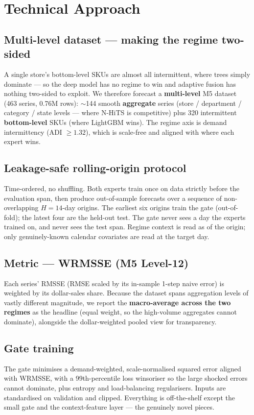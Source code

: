 \documentclass[11pt,a4paper]{article}
\begin{document}
\section{Technical Approach}
\subsection{Multi-level dataset --- making the regime two-sided}
A single store's bottom-level SKUs are almost all intermittent, where trees simply dominate --- so the
deep model has no regime to win and adaptive fusion has nothing two-sided to exploit. We therefore
forecast a \textbf{multi-level} M5 dataset (463 series, 0.76M rows): $\sim$144 smooth \textbf{aggregate}
series (store / department / category / state levels --- where N-HiTS is competitive) plus 320
intermittent \textbf{bottom-level} SKUs (where LightGBM wins). The regime axis is demand intermittency
(ADI $\geq 1.32$), which is scale-free and aligned with where each expert wins.

\subsection{Leakage-safe rolling-origin protocol}
Time-ordered, no shuffling. Both experts train once on data strictly before the evaluation span, then
produce out-of-sample forecasts over a sequence of non-overlapping $H=14$-day origins. The earliest
six origins train the gate (out-of-fold); the latest four are the held-out test. The gate never sees a
day the experts trained on, and never sees the test span. Regime context is read as of the origin;
only genuinely-known calendar covariates are read at the target day.

\subsection{Metric --- WRMSSE (M5 Level-12)}
Each series' RMSSE (RMSE scaled by its in-sample 1-step naive error) is weighted by its dollar-sales
share. Because the dataset spans aggregation levels of vastly different magnitude, we report the
\textbf{macro-average across the two regimes} as the headline (equal weight, so the high-volume
aggregates cannot dominate), alongside the dollar-weighted pooled view for transparency.

\subsection{Gate training}
The gate minimises a demand-weighted, scale-normalised squared error aligned with WRMSSE, with a
99th-percentile loss winsoriser so the large shocked errors cannot dominate, plus entropy and
load-balancing regularisers. Inputs are standardised on validation and clipped. Everything is
off-the-shelf except the small gate and the context-feature layer --- the genuinely novel pieces.
\end{document}
